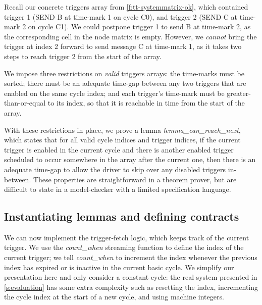 Recall our concrete triggers array from \autoref{f:tt-systemmatrix-ok}, which contained trigger 1 (SEND B at time-mark 1 on cycle C0), and trigger 2 (SEND C at time-mark 2 on cycle C1).
We could postpone trigger 1 to send B at time-mark 2, as the corresponding cell in the node matrix is empty.
However, we \emph{cannot} bring the trigger at index 2 forward to send message C at time-mark 1, as it takes two steps to reach trigger 2 from the start of the array.

We impose three restrictions on \emph{valid} triggers arrays: the time-marks must be sorted; there must be an adequate time-gap between any two triggers that are enabled on the same cycle index; and each trigger's time-mark must be greater-than-or-equal to its index, so that it is reachable in time from the start of the array.

With these restrictions in place, we prove a lemma \emph{lemma_can_reach_next}, which states that for all valid cycle indices and trigger indices, if the current trigger is enabled in the current cycle and there is another enabled trigger scheduled to occur somewhere in the array after the current one, then there is an adequate time-gap to allow the driver to skip over any disabled triggers in-between.
These properties are straightforward in a theorem prover, but are difficult to state in a model-checker with a limited specification language.

\subsection{Instantiating lemmas and defining contracts}
\label{s:motivation:contract}

We can now implement the trigger-fetch logic, which keeps track of the current trigger.
We use the \emph{count_when} streaming function to define the index of the current trigger; we tell \emph{count_when} to increment the index whenever the previous index has expired or is inactive in the current basic cycle.
We simplify our presentation here and only consider a constant cycle: the real system presented in \autoref{s:evaluation} has some extra complexity such as resetting the index, incrementing the cycle index at the start of a new cycle, and using machine integers.

